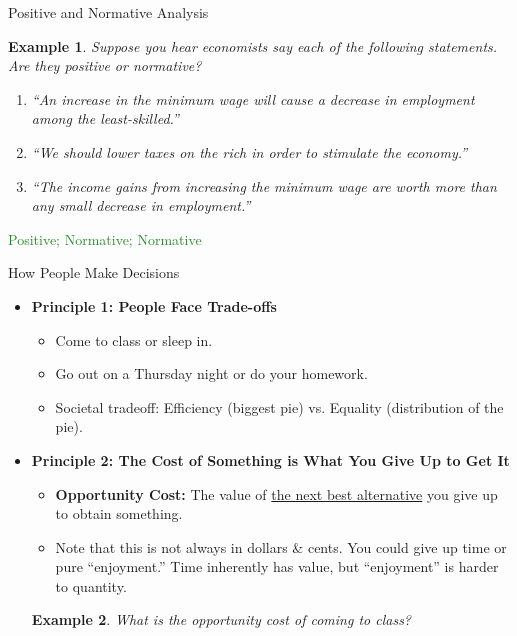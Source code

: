 \documentclass[xcolor={dvipsnames},pdf, hyperref={colorlinks=true, citecolor=ForestGreen, linkcolor=BlueViolet, urlcolor=Magenta}]{beamer}
\newtheorem{exmp}{Example}[section]
\newcommand{\defn}[1]{\textbf{#1}}
\newcommand{\ddp}[1]{{\textcolor{ForestGreen}{#1}}}
\begin{document}
\begin{frame}{Positive and Normative Analysis}
	\begin{exmp}
	Suppose you hear economists say each of the following statements. Are they positive or normative?
	\begin{enumerate}
		\item ``An increase in the minimum wage will cause a decrease in employment among the least-skilled.'' 
		\item ``We should lower taxes on the rich in order to stimulate the economy.'' 
		\item ``The income gains from increasing the minimum wage are worth more than any small decrease in employment.''
	\end{enumerate}
\end{exmp}
\ddp{\pause Positive; Normative; Normative}
\end{frame}



\begin{frame}{How People Make Decisions}
	\begin{itemize}
		\item \textbf{Principle 1: People Face Trade-offs}
			\begin{itemize}
					\item Come to class or sleep in.
					\item Go out on a Thursday night or do your homework.
					\item Societal tradeoff: Efficiency (biggest pie) vs. Equality (distribution of the pie).
			\end{itemize}
		\item 	\textbf{Principle 2: The Cost of Something is What You Give Up to Get It}

		\begin{itemize}
			\item \defn{Opportunity Cost:} The value of \underline{the next best alternative} you give up to obtain something.
			\item Note that this is not always in dollars \& cents. You could give up time or pure ``enjoyment.'' Time inherently has value, but ``enjoyment'' is harder to quantity. 
		\end{itemize}

		
		\begin{exmp}
			What is the opportunity cost of coming to class? 
		\end{exmp} 
		\pause \ddp{The value of the next best alternative. Sleeping in, time studying, etc.}
	\end{itemize}
\end{frame}
\end{document}
